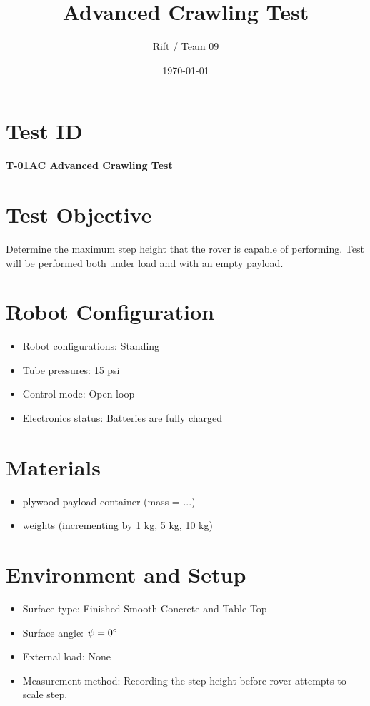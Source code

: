 \documentclass[11pt]{article}
\title{Advanced Crawling Test}
\author{Rift / Team 09}
\date{\today}
\begin{document}
\maketitle

\section*{Test ID}
\textbf{T-01AC Advanced Crawling Test} 

\section*{Test Objective}
Determine the maximum step height that the rover is capable of performing. Test will be performed both under load and with an empty payload.

\section*{Robot Configuration}
\begin{itemize}[noitemsep]
    \item Robot configurations: Standing
    \item Tube pressures: 15 psi
    \item Control mode: Open-loop
    \item Electronics status: Batteries are fully charged
\end{itemize}

\section*{Materials}
\begin{itemize}[noitemsep]
    \item plywood payload container (mass = ...)
    \item weights (incrementing by 1 kg, 5 kg, 10 kg)
    
\end{itemize}

\section*{Environment and Setup}
\begin{itemize}[noitemsep]
    \item Surface type: Finished Smooth Concrete and Table Top
    \item Surface angle: $\psi = 0 {\degree}$ 
    \item External load: None 
    \item Measurement method: Recording the step height before rover attempts to scale step.
\end{itemize}
\end{document}
